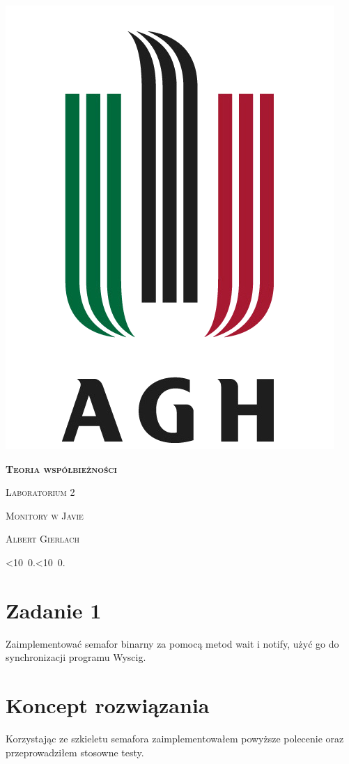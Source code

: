 \documentclass[12pt]{article}
\def\mydate{\leavevmode\hbox{\twodigits\day.\twodigits\month.\the\year}}
\def\twodigits#1{\ifnum#1<10 0\fi\the#1}
\begin{document}
\thispagestyle{empty}
\begin{center}
\begin{minipage}{0.75\linewidth}
    \centering
    \includegraphics[width=0.45\linewidth]{agh_logo2.png}
    \par
    \vspace{2cm}
    {\bfseries{\scshape{\Huge  Teoria współbieżności}}}
    \par
    \vspace{2cm}
    {\scshape{\Large Laboratorium 2}}
    \par
    \vspace{0.4cm}
    {\scshape{\Large Monitory w Javie}}
    \par
    \vspace{3cm}

    {\scshape{\Large Albert Gierlach}}\par
    \vspace{1cm}

    {\Large \mydate}
\end{minipage}
\end{center}
\clearpage



\section{Zadanie 1}
Zaimplementować semafor binarny za pomocą metod wait i notify, użyć go do synchronizacji programu Wyscig.

  
\section{Koncept rozwiązania}
Korzystając ze szkieletu semafora zaimplementowałem powyższe polecenie oraz przeprowadziłem stosowne testy.
\end{document}
